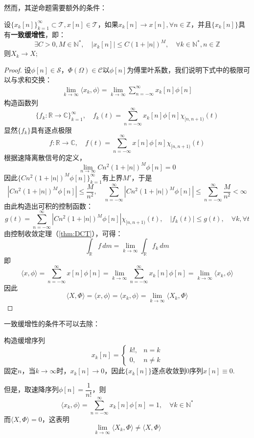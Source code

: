 然而，其逆命题需要额外的条件：
\begin{theorem}\label{thm:DTFT_continuous_2}
    设$\{x_k[n]\}_{k=1}^\infty\subset\mathcal{T},x[n]\in\mathcal{T}$，如果$x_k[n]\to x[n],\forall n\in\mathbb{Z}$，并且$\{x_k[n]\}$具有\textbf{一致缓增性}，即：
    $$\exists C>0,M\in\mathbb{N}^*,\quad |x_k[n]|\le C(1+|n|)^M,\quad \forall k\in\mathbb{N}^*,n\in\mathbb{Z}$$
    则$X_k\to X$;
\end{theorem}
\begin{proof}
    设$\phi[n]\in\mathcal{S}$，$\Phi(\Omega)\in\mathcal{C}$以$\phi[n]$为傅里叶系数，我们说明下式中的极限可以与求和交换：\begin{align*}
        \lim_{k\to\infty}\langle x_k,\phi\rangle=\lim_{k\to\infty}\sum_{n=-\infty}^\infty x_k[n]\phi[n]
    \end{align*}
    构造函数列
    $$\{f_k:\mathbb{R}\to\mathbb{C}\}_{k=1}^\infty,\quad f_k(t)=\sum_{n=-\infty}^\infty x_k[n]\phi[n]\chi_{[n,n+1)}(t)$$
    显然$\{f_k\}$具有逐点极限
    $$f:\mathbb{R}\to\mathbb{C},\quad f(t)=\sum_{n=-\infty}^\infty x[n]\phi[n]\chi_{[n,n+1)}(t)$$
    根据速降离散信号的定义，
    $$\lim_{n\to\infty}Cn^2(1+|n|)^M\phi[n]=0$$
    因此$\{Cn^2(1+|n|)^M\phi[n]\}_{k=1}^\infty$有上界$M'$，于是
    $$\left|Cn^2(1+|n|)^M\phi[n]\right|\le \dfrac{M}{n^2},\quad \sum_{n=-\infty}^\infty \left|Cn^2(1+|n|)^M\phi[n]\right|\le\sum_{n=-\infty}^\infty\frac{M}{n^2}<\infty$$
    由此构造出可积的控制函数：
    $$g(t)=\sum_{n=-\infty}^\infty \left|Cn^2(1+|n|)^M\phi[n]\right|\chi_{[n,n+1)}(t),\quad |f_k(t)|\le g(t),\quad \forall k,\forall t$$
    由控制收敛定理（\cref{thm:DCT}），可得：
    $$\int_{\mathbb{R}}f\,dm=\lim_{k\to\infty}\int_{\mathbb{R}}f_k\,dm$$
    即
    $$\langle x,\phi\rangle=\sum_{n=-\infty}^\infty x[n]\phi[n]=\lim_{k\to\infty}\sum_{n=-\infty}^\infty x_k[n]\phi[n]=\lim_{k\to\infty}\langle x_k,\phi\rangle$$
    因此
    $$\langle X,\Phi\rangle=\langle x,\phi\rangle=\langle x_k,\phi\rangle=\lim_{k\to\infty}\langle X_k,\Phi\rangle$$
\end{proof}

一致缓增性的条件不可以去除：
\begin{example}
    构造缓增序列
    $$x_k[n]=\begin{cases}
            k!, & n=k     \\
            0,  & n\neq k
        \end{cases}$$
    固定$n$，当$k\to\infty$时，$x_k[n]\to 0$，因此$\{x_k[n]\}$逐点收敛到0序列$x[n]\equiv 0$.

    但是，取速降序列$\phi[n]=\dfrac{1}{n!}$，则
    $$\langle x_k,\phi\rangle=\sum_{n=-\infty}^\infty x_k[n]\phi[n]=1,\quad \forall k\in \mathbb{N}^*$$
    而$\langle X,\Phi\rangle=0$，这表明
    $$\lim_{k\to\infty}\langle X_k,\Phi\rangle\neq \langle X,\Phi\rangle$$
\end{example}

